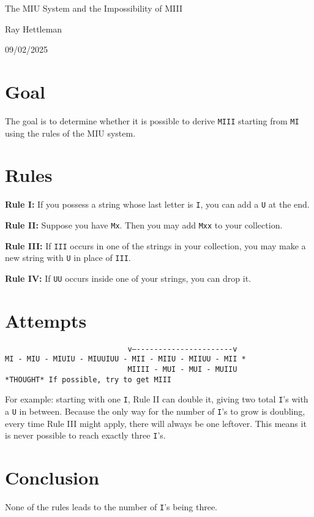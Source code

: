 \documentclass[11pt]{article}
\begin{document}
\begin{center}
{\LARGE The MIU System and the Impossibility of MIII\par}
\vspace{0.5em}
{\large Ray Hettleman\par}
\vspace{0.5em}
{\normalsize 09/02/2025\par}
\end{center}

\section*{Goal}
The goal is to determine whether it is possible to derive \texttt{MIII} starting from \texttt{MI} using the rules of the MIU system.

\section*{Rules}
\textbf{Rule I:} If you possess a string whose last letter is \texttt{I}, you can add a \texttt{U} at the end.  

\textbf{Rule II:} Suppose you have \texttt{Mx}. Then you may add \texttt{Mxx} to your collection.  

\textbf{Rule III:} If \texttt{III} occurs in one of the strings in your collection, you may make a new string with \texttt{U} in place of \texttt{III}.  

\textbf{Rule IV:} If \texttt{UU} occurs inside one of your strings, you can drop it.  

\section*{Attempts}
\noindent
\begin{verbatim}
                            v—----------------------v
MI - MIU - MIUIU - MIUUIUU - MII - MIIU - MIIUU - MII *
                            MIIII - MUI - MUI - MUIIU
*THOUGHT* If possible, try to get MIII
\end{verbatim}

For example: starting with one \texttt{I}, Rule II can double it, giving two total \texttt{I}'s with a \texttt{U} in between. Because the only way for the number of \texttt{I}'s to grow is doubling, every time Rule III might apply, there will always be one leftover. This means it is never possible to reach exactly three \texttt{I}'s.

\section*{Conclusion}
None of the rules leads to the number of \texttt{I}'s being three.  
\end{document}
